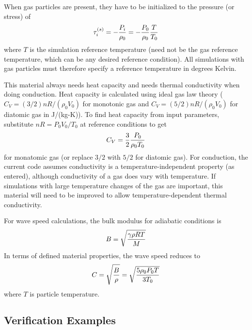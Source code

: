 \documentclass[11pt]{book}
\begin{document}
When gas particles are present, they have to be initialized to the pressure (or stress) of
\begin{equation}
     \tau_i^{(s)} =  - {P_i\over \rho_0} = - {P_0\over \rho_0} {T\over T_0}
\end{equation}
where $T$ is the simulation reference temperature (need not be the gas reference temperature, which can be any desired reference condition). All simulations with gas particles must therefore specify a reference temperature in degrees Kelvin.

This material always needs heat capacity and needs thermal conductivity when doing conduction. Heat capacity is calculated using ideal gas law theory ($C_V=(3/2)nR/(\rho_0 V_0)$ for monotonic gas and $C_V=(5/2)nR/(\rho_0 V_0)$ for diatomic gas in J/(kg-K)). To find heat capacity from input parameters, substitute $nR = P_0V_0/T_0$ at reference conditions to get
\begin{equation}
     C_V =  {3\over 2} {P_0 \over \rho_0T_0}
\end{equation}
for monatomic gas (or replace $3/2$ with $5/2$ for diatomic gas). For conduction, the current code assumes conductivity is a temperature-independent property (as entered), although conductivity of a gas does vary with temperature. If simulations with large temperature changes of the gas are important, this material will need to be improved to allow temperature-dependent thermal conductivity.

For wave speed calculations, the bulk modulus for adiabatic conditions is
\begin{equation}
   B = \sqrt{\gamma\rho R T\over M}
\end{equation}
In terms of defined material properties, the wave speed reduces to
\begin{equation}
   C = \sqrt{B\over\rho} = \sqrt{{5\rho_0P_0T\over 3T_0}}
\end{equation}
where $T$ is particle temperature.


\subsection{Verification Examples}
\end{document}
